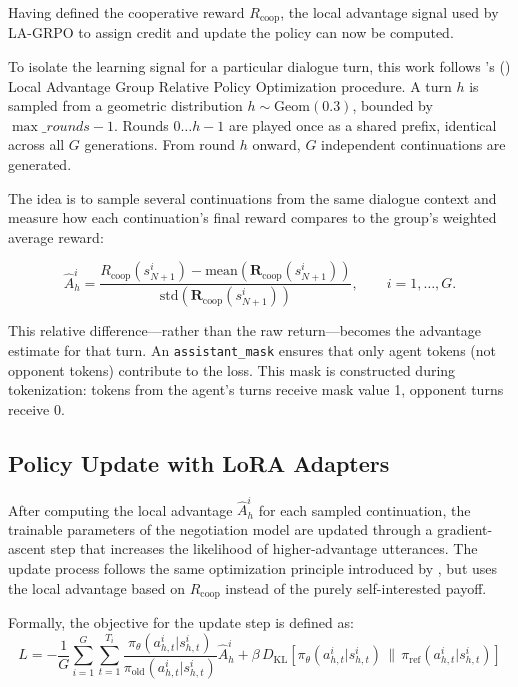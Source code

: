 \documentclass[12pt,a4paper]{article}
\begin{document}
Having defined the cooperative reward $R_{\text{coop}}$, the local advantage signal used by LA-GRPO to assign credit and update the policy can now be computed.
\par
To isolate the learning signal for a particular dialogue turn, this work follows \citeauthor{franceschetti2025advantage}'s (\citeyear{franceschetti2025advantage}) Local Advantage Group Relative Policy Optimization procedure. A turn $h$ is sampled from a geometric distribution $h \sim \mathrm{Geom}(0.3)$, bounded by $\max\_rounds - 1$. Rounds $0 \ldots h-1$ are played once as a shared prefix, identical across all $G$ generations. From round $h$ onward, $G$ independent continuations are generated.

The idea is to sample several continuations from the same dialogue context and measure how each continuation's final reward compares to the group's weighted average reward:

\begin{equation}
    \hat{A}_h^i = 
    \frac{R_{\text{coop}}(s_{N+1}^i) - \mathrm{mean}(\mathbf{R}_{\text{coop}}(s_{N+1}^i))}
         {\mathrm{std}(\mathbf{R}_{\text{coop}}(s_{N+1}^i))},
    \qquad i = 1, \ldots, G.
\end{equation}

This relative difference---rather than the raw return---becomes the advantage estimate for that turn. An \texttt{assistant\_mask} ensures that only agent tokens (not opponent tokens) contribute to the loss. This mask is constructed during tokenization: tokens from the agent's turns receive mask value 1, opponent turns receive 0.


\subsection{Policy Update with LoRA Adapters}

After computing the local advantage $\hat{A}_h^i$ for each sampled continuation, the trainable parameters of the negotiation model are updated through a gradient-ascent step that increases the likelihood of higher-advantage utterances. The update process follows the same optimization principle introduced by \citet{franceschetti2025advantage}, but uses the local advantage based on $R_{\text{coop}}$ instead of the purely self-interested payoff.

Formally, the objective for the update step is defined as:
\begin{equation}
L = - \frac{1}{G} \sum_{i=1}^{G}\sum_{t=1}^{T_i}
    \frac{\pi_{\theta}(a_{h,t}^i|s_{h,t}^i)}{\pi_{\text{old}}(a_{h,t}^i|s_{h,t}^i)}
    \hat{A}_h^i
    + \beta \, D_{\mathrm{KL}}\!\left[\pi_{\theta}(a_{h,t}^i|s_{h,t}^i) \,\|\, \pi_{\mathrm{ref}}(a_{h,t}^i|s_{h,t}^i)\right]
\end{equation}
\end{document}
